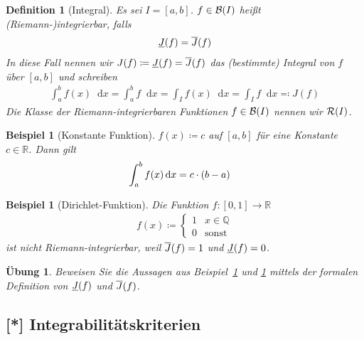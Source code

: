 \documentclass[11pt, twoside, a4paper]{article}
\theoremstyle{plain}
\newtheorem{definition}[blockelement]{Definition}
\newtheorem{uebung}[blockelement]{Übung}
\newtheorem{beispiel}[blockelement]{Beispiel}
\numberwithin{equation}{subsection}
\newcommand{\pair}[1]{\left(#1\right)}
\newcommand{\of}[1]{\mathopen{}\mathclose{}\bgroup\left(#1\aftergroup\egroup\right)}
\newcommand{\interv}[1]{\left[#1\right]}
\newcommand{\fromto}{\rightarrow{}}
\newcommand{\definedas}[0]{\coloneqq}
\newcommand{\definedasbackwards}[0]{\eqqcolon}
\newcommand{\dif}{\mathop{}\!\mathrm{d}}
\newcommand{\ov}[1]{\overline{#1}}
\newcommand{\un}[1]{\underline{#1}}
\newcommand{\R}{\mathbb{R}}
\newcommand{\Q}{\mathbb{Q}}
\newcommand{\mR}{\mathcal{R}}
\newcommand{\mB}{\mathcal{B}}
\begin{document}
    \begin{definition}[Integral]
        Es sei $I=\interv{a,b}$. $f\in \mB\of{I}$ heißt (Riemann-)integrierbar, falls
        \begin{align*}
            \underline{J}\of{f} = \overline{J}\of{f}
        \end{align*}
        In diese Fall nennen wir $J(f) \definedas \underline{J}\of{f} = \overline{J}\of{f}$ das (bestimmte) Integral von $f$ über $\interv{a,b}$ und schreiben
        \begin{align*}
            \int_{a}^{b} f(x) \dif x = \int_{a}^{b} f\dif x = \int_{I} f(x)\dif x = \int_{I} f\dif x \definedasbackwards J(f)
        \end{align*}
        Die Klasse der Riemann-integrierbaren Funktionen $f\in \mB\of{I}$ nennen wir $\mR\of{I}$.
    \end{definition}

    \begin{beispiel}[Konstante Funktion]
        \marginnote{[18. Apr]}
        \label{beispiel:int-konstant}
        $f(x) \definedas c$ auf $\interv{a,b}$ für eine Konstante $c\in\R$. Dann gilt
        \begin{align*}
            \int_{a}^{b} f\of{x} \dif x &= c\cdot\pair{b-a}
        \end{align*}
    \end{beispiel}

    \begin{beispiel}[Dirichlet-Funktion]
        \label{beispiel:int-dirichlet}
        Die Funktion $f: \interv{0,1}\fromto\R$
        \begin{align*}
            f(x) \definedas \begin{cases}
                                1 &x\in \Q\\
                                0 &\text{sonst}
            \end{cases}
        \end{align*}
        ist nicht Riemann-integrierbar, weil $\overline{J}\of{f} = 1$ und $\underline{J}\of{f} = 0$.
    \end{beispiel}
    
    \begin{uebung}
        Beweisen Sie die Aussagen aus Beispiel~\ref{beispiel:int-konstant} und \ref{beispiel:int-dirichlet} mittels der formalen Definition von $\un{J}\of{f}$ und $\ov{J}\of{f}$.
    \end{uebung}

    \subsection{[*] Integrabilitätskriterien}
\end{document}
